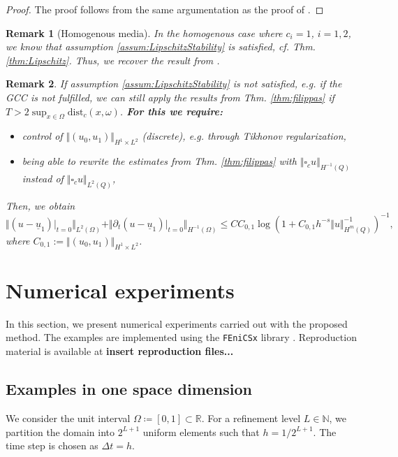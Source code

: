 \documentclass[sn-mathphys-num]{sn-jnl}
\newtheorem{rmk}{Remark}
\numberwithin{equation}{section}
\newcommand{\wop}{\square_c}
\newcommand{\ul}{\underline{u}}
\newcommand{\dt}{\partial_t}
\begin{document}
\begin{proof}
    The proof follows from the same argumentation as the proof of \cite[Thm. 4.4]{BP24}.
\end{proof}


\begin{rmk}[Homogenous media]\label{rem:homMedia}
    In the homogenous case where $c_i = 1$, $i = 1,2$, we know that assumption \ref{assum:LipschitzStability} is satisfied, cf. Thm. \ref{thm:Lipschitz}. Thus, we recover the result from \cite[Thm. 4.4]{BP24}.
\end{rmk}

\begin{rmk}
    If assumption \ref{assum:LipschitzStability} is not satisfied, e.g. if the GCC is not fulfilled, we can still apply the results from Thm. \ref{thm:filippas} if $T > 2 \sup_{x \in \Omega} \text{dist}_c(x,\omega)$. \textbf{For this we require:} 
    \begin{itemize}
        \item control of $\Vert (u_0,u_1) \Vert_{H^1 \times L^2}$ (discrete), e.g. through Tikhonov regularization,
        \item being able to rewrite the estimates from Thm. \ref{thm:filippas} with $\Vert \wop u \Vert_{H^{-1}(Q)}$ instead of $\Vert \wop u \Vert_{L^2(Q)}$,
    \end{itemize}
    Then, we obtain 
    \begin{equation}
        \Vert (u - \ul_1) \vert_{t = 0} \Vert_{L^2(\Omega)}  + \Vert \dt (u - \ul_1) \vert_{t = 0} \Vert_{H^{-1}(\Omega)} \le C C_{0,1} \log(1 + C_{0,1} h^{-s} \Vert u \Vert_{H^m(Q)}^{-1})^{-1},
    \end{equation} 
    where $C_{0,1} := \Vert (u_0,u_1) \Vert_{H^1 \times L^2}$.
\end{rmk}


\section{Numerical experiments}
\noindent In this section, we present numerical experiments carried out with the proposed method. The examples are implemented using the \texttt{FEniCSx} library \cite{BarattaEtal2023,BasixJoss,ScroggsEtal2022,AlnaesEtal2014}. Reproduction material is available at \textbf{insert reproduction files...}

\subsection{Examples in one space dimension}
\noindent We consider the unit interval $\Omega \coloneqq [0,1] \subset \mathbb{R}$. For a refinement level $L \in \mathbb{N}$, we partition the domain into $2^{L+1}$ uniform elements such that $h = 1/2^{L+1}$. The time step is chosen as $\Delta t = h$. 
\end{document}
